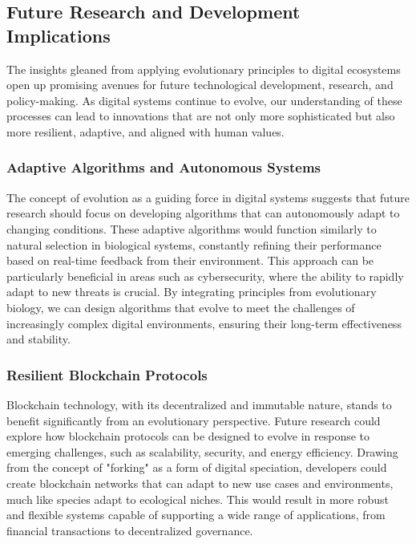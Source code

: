 \documentclass[12pt,twoside]{article}
\begin{document}
\subsection{Future Research and Development Implications}

The insights gleaned from applying evolutionary principles to digital ecosystems open up promising avenues for future technological development, research, and policy-making. As digital systems continue to evolve, our understanding of these processes can lead to innovations that are not only more sophisticated but also more resilient, adaptive, and aligned with human values.

\subsubsection{Adaptive Algorithms and Autonomous Systems}
The concept of evolution as a guiding force in digital systems suggests that future research should focus on developing algorithms that can autonomously adapt to changing conditions. These adaptive algorithms would function similarly to natural selection in biological systems, constantly refining their performance based on real-time feedback from their environment. This approach can be particularly beneficial in areas such as cybersecurity, where the ability to rapidly adapt to new threats is crucial. By integrating principles from evolutionary biology, we can design algorithms that evolve to meet the challenges of increasingly complex digital environments, ensuring their long-term effectiveness and stability.


\subsubsection{Resilient Blockchain Protocols}

Blockchain technology, with its decentralized and immutable nature, stands to benefit significantly from an evolutionary perspective. Future research could explore how blockchain protocols can be designed to evolve in response to emerging challenges, such as scalability, security, and energy efficiency. Drawing from the concept of "forking" as a form of digital speciation, developers could create blockchain networks that can adapt to new use cases and environments, much like species adapt to ecological niches. This would result in more robust and flexible systems capable of supporting a wide range of applications, from financial transactions to decentralized governance.
\end{document}
